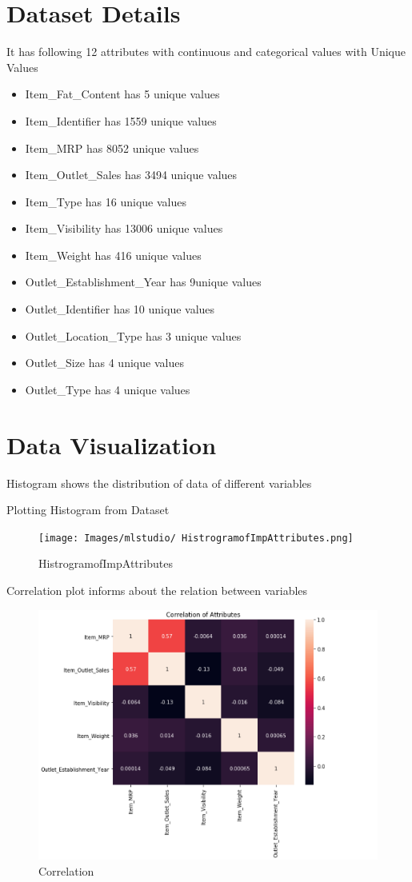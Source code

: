 \section{Dataset Details}
It has following 12 attributes with continuous and categorical values 
with Unique Values
\begin{itemize}
\item Item_Fat_Content has 5 unique values
\item Item_Identifier has 1559 unique values
\item Item_MRP has 8052 unique values
\item Item_Outlet_Sales has 3494 unique values
\item Item_Type has 16 unique values
\item Item_Visibility has 13006 unique values
\item Item_Weight has 416 unique values
\item Outlet_Establishment_Year has 9unique values
\item Outlet_Identifier has 10 unique values
\item Outlet_Location_Type has 3 unique values
\item Outlet_Size has 4 unique values
\item Outlet_Type has 4 unique values
\end{itemize}


\section{Data Visualization}
Histogram shows the distribution of data of different variables 

Plotting Histogram from Dataset

\begin{figure}[pic1]
	\centering\texttt{[image: Images/mlstudio/
HistrogramofImpAttributes.png]}
	\caption{HistrogramofImpAttributes}
\label{fig:HistrogramofImpAttributes}
\end{figure}

Correlation plot informs about the relation between variables 
\begin{figure}[pic2]
	\centering\includegraphics[width=\columnwidth]
{Images/mlstudio/Correlation.png}
	\caption{Correlation}\label{fig:Correlation}
\end{figure}

